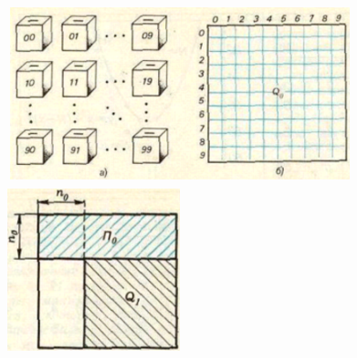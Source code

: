 \documentclass{article}
\begin{document}
\includegraphics[width=10cm, height=5cm ]{6.png}
\includegraphics[width=5cm, height=5cm ]{7.png}

\vspace{0.5cm}
\end{document}
